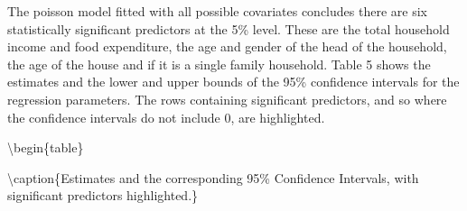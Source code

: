 \documentclass[
]{article}
\begin{document}
The poisson model fitted with all possible covariates concludes there
are six statistically significant predictors at the 5\% level. These are
the total household income and food expenditure, the age and gender of
the head of the household, the age of the house and if it is a single
family household. Table 5 shows the estimates and the lower and upper
bounds of the 95\% confidence intervals for the regression parameters.
The rows containing significant predictors, and so where the confidence
intervals do not include 0, are highlighted.

\textbackslash begin\{table\}

\textbackslash caption\{\label{tab:table of estimates and confidence intervals}Estimates
and the corresponding 95\% Confidence Intervals, with significant
predictors highlighted.\} \centering
\end{document}
